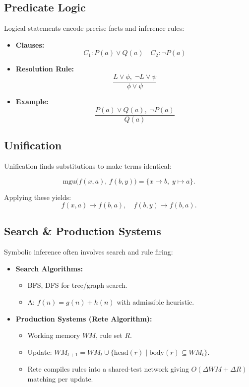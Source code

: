 \documentclass[12pt]{article}
\begin{document}
\subsection{Predicate Logic}

Logical statements encode precise facts and inference rules:

\begin{itemize}
  \item \textbf{Clauses:}  
    \[
      C_1: P(a)\lor Q(a)
      \quad
      C_2: \neg P(a)
    \]
  \item \textbf{Resolution Rule:}
    \[
      \frac{L \lor \phi,\;\neg L \lor \psi}{\phi \lor \psi}
    \]
  \item \textbf{Example:}
    \[
      \frac{P(a)\lor Q(a),\;\neg P(a)}{Q(a)}
    \]
\end{itemize}

\subsection{Unification}

Unification finds substitutions to make terms identical:

\[
  \mathrm{mgu}\bigl(f(x,a),\,f(b,y)\bigr)
  = \{x\mapsto b,\;y\mapsto a\}.
\]

Applying these yields:
\[
  f(x,a)\to f(b,a),
  \quad
  f(b,y)\to f(b,a).
\]

\subsection{Search \& Production Systems}

Symbolic inference often involves search and rule firing:

\begin{itemize}
  \item \textbf{Search Algorithms:}
  \begin{itemize}
    \item BFS, DFS for tree/graph search.
    \item A\*: \(f(n)=g(n)+h(n)\) with admissible heuristic.
  \end{itemize}
  \item \textbf{Production Systems (Rete Algorithm):}
  \begin{itemize}
    \item Working memory \(WM\), rule set \(R\).
    \item Update: \(WM_{t+1}=WM_t\cup\{\mathrm{head}(r)\mid \mathrm{body}(r)\subseteq WM_t\}\).
    \item Rete compiles rules into a shared-test network giving \(O(\Delta WM + \Delta R)\) matching per update.
  \end{itemize}
\end{itemize}
\end{document}
